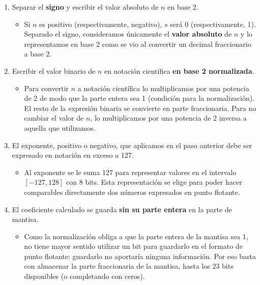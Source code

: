 \documentclass[spanish,a4paper,]{article}
\providecommand{\tightlist}{%
  \setlength{\itemsep}{0pt}\setlength{\parskip}{0pt}}
\begin{document}
\begin{enumerate}
\def\labelenumi{\arabic{enumi}.}
\tightlist
\item
  Separar el \textbf{signo} y escribir el valor absoluto de \(n\) en
  base 2.

  \begin{itemize}
  \tightlist
  \item
    Si \(n\) es positivo (respectivamente, negativo), \(s\) será 0
    (respectivamente, 1). Separado el signo, consideramos únicamente el
    \textbf{valor absoluto} de \(n\) y lo representamos en base 2 como
    se vio al convertir un decimal fraccionario a base 2.
  \end{itemize}
\item
  Escribir el valor binario de \(n\) en notación científica \textbf{en
  base 2 normalizada}.

  \begin{itemize}
  \tightlist
  \item
    Para convertir \(n\) a notación científica lo multiplicamos por una
    potencia de 2 de modo que la parte entera sea 1 (condición para la
    normalización). El resto de la expresión binaria se convierte en
    parte fraccionaria. Para no cambiar el valor de \(n\), lo
    multiplicamos por una potencia de 2 inversa a aquella que
    utilizamos.
  \end{itemize}
\item
  El exponente, positivo o negativo, que aplicamos en el paso anterior
  debe ser expresado en notación en exceso a 127.

  \begin{itemize}
  \tightlist
  \item
    Al exponente se le suma 127 para representar valores en el intervalo
    \([-127,128]\) con 8 bits. Esta representación se elige para poder
    hacer comparables directamente dos números expresados en punto
    flotante.
  \end{itemize}
\item
  El coeficiente calculado se guarda \textbf{sin su parte entera} en la
  parte de mantisa.

  \begin{itemize}
  \tightlist
  \item
    Como la normalización obliga a que la parte entera de la mantisa sea
    1, no tiene mayor sentido utilizar un bit para guardarlo en el
    formato de punto flotante: guardarlo no aportaría ninguna
    información. Por eso basta con almacenar la parte fraccionaria de la
    mantisa, hasta los 23 bits disponibles (o completando con ceros).
  \end{itemize}
\end{enumerate}
\end{document}
